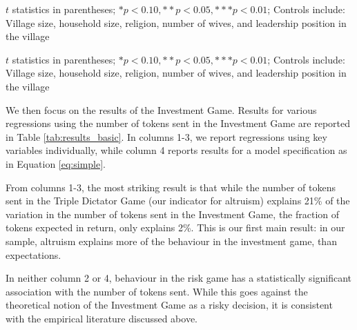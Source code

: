 \newcommand{\notes}{
		\footnotesize
		\item $t$ statistics in parentheses; $* p < 0.10, ** p < 0.05, *** p < 0.01$; Controls include: Village size, household size, religion, number of wives, and leadership position in the village
		\item
}

\begin{threeparttable}[htb]
	\small
	\caption{Beliefs and preferences across market exposure}
	\label{tab:results_expect}
	\centering
	
	\begin{tablenotes}
		\notes
	\end{tablenotes}
\end{threeparttable}


\begin{threeparttable}[htb]
	\centering
	\small

	\caption{Determinants of sending behaviour in the trust game}
	\label{tab:results_basic}
	
	
	\begin{tablenotes}
		\notes
	\end{tablenotes}
\end{threeparttable}

We then focus on the results of the Investment Game. Results for various regressions using the number of tokens sent in the Investment Game are reported in Table \ref{tab:results_basic}. In columns 1-3, we report regressions using key variables individually, while column 4 reports results for a model specification as in Equation \ref{eq:simple}. 

From columns 1-3, the most striking result is that while the number of tokens sent in the Triple Dictator Game (our indicator for altruism) explains 21\% of the variation in the number of tokens sent in the Investment Game, the fraction of tokens expected in return, only explains 2\%. This is our first main result: in our sample, altruism explains more of the behaviour in the investment game, than expectations.

In neither column 2 or 4, behaviour in the risk game has a statistically significant association with the number of tokens sent. While this goes against the theoretical notion of the Investment Game as a risky decision, it is consistent with the empirical literature discussed above.

